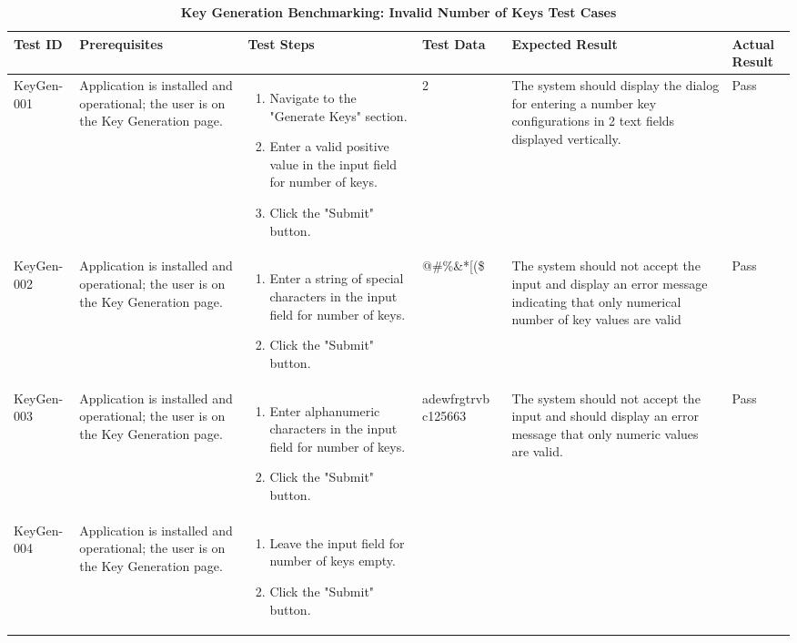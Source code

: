 \documentclass[]{final_report}
\theoremstyle{definition}
\begin{document}
\begin{longtable}{|l|p{2.5cm}|p{2.5cm}|p{2.5cm}|p{2.5cm}|p{3cm}|}
  \caption{\textbf{Key Generation Benchmarking: Invalid Number of Keys Test Cases}}
  \hline
  \textbf{Test ID} & \textbf{Prerequisites} & \textbf{Test Steps} & \textbf{Test Data} & \textbf{Expected Result} & \textbf{Actual Result} \\
  \hline
  KeyGen-001 & Application is installed and operational; the user is on the Key Generation page. & 
  \begin{enumerate}
  \item Navigate to the "Generate Keys" section.
  \item Enter a valid positive value in the input field for number of keys.
  \item Click the "Submit" button.
  \end{enumerate} & 2 & The system should display the dialog for entering a number key configurations  in 2 text fields displayed vertically. & Pass \\
  \hline
  KeyGen-002 & Application is installed and operational; the user is on the Key Generation page. & 
  \begin{enumerate}
  \item Enter a string of special characters in the input field for number of keys.
    \item Click the "Submit" button.
  \end{enumerate} & @\#\%\&*[(\$ & The system should not accept the input and display an error message indicating that only numerical number of key values are valid & Pass \\
  \hline
   KeyGen-003 & Application is installed and operational; the user is on the Key Generation page. & 
  \begin{enumerate}
  \item Enter alphanumeric characters in the input field for number of keys.
  \item Click the "Submit" button.
  \end{enumerate} & adewfrgtrvb
  c125663 & The system should not accept the input and should display an error message that only numeric values are valid. & Pass \\
  \hline
   KeyGen-004 & Application is installed and operational; the user is on the Key Generation page. & 
  \begin{enumerate}
  \item Leave the input field for number of keys empty.
  \item Click the "Submit" button.

\end{enumerate}
\end{longtable}
\end{document}
